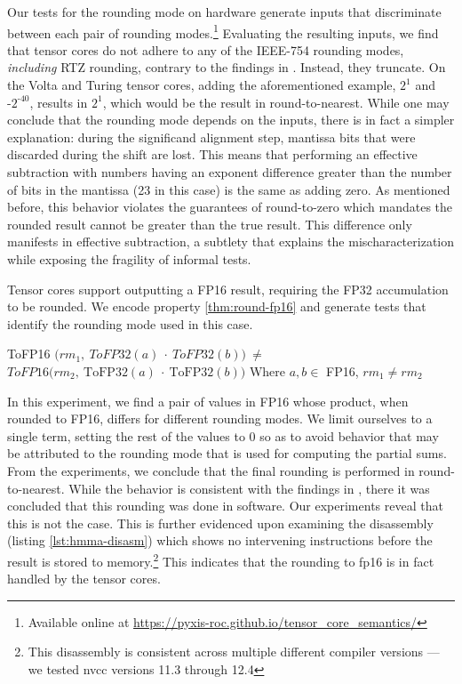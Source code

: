 Our tests for the rounding mode on hardware generate inputs that discriminate between each pair of rounding modes.\footnote{Available online at \url{https://pyxis-roc.github.io/tensor\_core\_semantics/}} Evaluating the resulting inputs, we find that tensor cores do not adhere to any of the IEEE-754 rounding modes, {\em including}  RTZ rounding, contrary to the findings in \citet{fasi2021numerical}. Instead, they truncate. On the Volta and Turing tensor cores, adding the aforementioned example, $2^1$ and $\text{-}2^{\text{-}40}$, results in $2^1$, which would be the result in round-to-nearest. While one may conclude that the rounding mode depends on the inputs, there is in fact a simpler explanation: during the significand alignment step, mantissa bits that were discarded during the shift are lost.  This means that performing an effective subtraction with numbers having an exponent difference greater than the number of bits in the mantissa (23 in this case) is the same as adding zero.  As mentioned before, this behavior violates the guarantees of round-to-zero which mandates the rounded result cannot be greater than the true result. This difference only manifests in effective subtraction, a subtlety that explains the mischaracterization while exposing the fragility of informal tests.

Tensor cores support outputting a FP16 result, requiring the FP32 accumulation to be rounded. We encode property \ref{thm:round-fp16} and generate tests that identify the rounding mode used in this case.
 
\begin{myprop}\label{thm:round-fp16}
    ToFP16 $\big(rm_1,~ToFP32(a)~\cdot~ToFP32(b)\big)~\neq $ \\
    $ToFP16 \big(rm_2,~\text{ToFP32}(a)~\cdot~\text{ToFP32}(b)\big)$ \hspace{2em}
    Where $a,b \in$ FP16, $rm_1 \neq rm_2$
\end{myprop}
In this experiment, we find a pair of values in FP16 whose product, when rounded to FP16, differs for different rounding modes.  We limit ourselves to a single term, setting the rest of the values to 0 so as to avoid behavior that may be attributed to the rounding mode that is used for computing the partial sums. From the experiments, we conclude that the final rounding is performed in round-to-nearest. While the behavior is consistent with the findings in \citeauthor{fasi2021numerical}, there it was concluded that this rounding was done in software. Our experiments reveal that this is not the case. This is further evidenced upon examining the disassembly (listing \ref{lst:hmma-disasm}) which shows no intervening instructions before the result is stored to memory.\footnote{This disassembly is consistent across multiple different compiler versions --- we tested nvcc versions 11.3 through 12.4} This indicates that the rounding to fp16 is in fact handled by the tensor cores.


